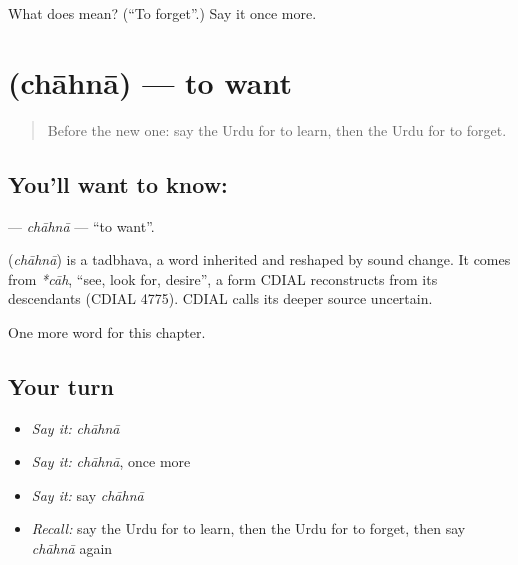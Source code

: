 \begin{tcolorbox}[breakable,colback=teal!4,colframe=teal!35!black,title={Before you move on}]
What does  mean? (\textquotedblleft{}To forget\textquotedblright{}.) Say it once more.
\end{tcolorbox}
\section[\texorpdfstring{\ur{چاہنا} (chāhnā)}{چاہنا (chāhnā)}]{ (chāhnā) — to want}

\label{lesson:UR-C51-chahna}



\begin{quote}
Before the new one: say the Urdu for to learn, then the Urdu for to forget.
\end{quote}

\subsection*{You'll want to know: }
\textbf{} — \emph{chāhnā} — \textquotedblleft{}to want\textquotedblright{}.

\begin{cousinweb}
\textbf{} (\emph{chāhnā}) is a tadbhava, a word inherited and reshaped by sound change. It comes from \emph{*cāh}, \textquotedblleft{}see, look for, desire\textquotedblright{}, a form CDIAL reconstructs from its descendants (CDIAL 4775). CDIAL calls its deeper source uncertain.
\end{cousinweb}

\begin{grammarlens}[title={What you've built}]
One more word for this chapter.
\end{grammarlens}

\subsection*{Your turn}
\begin{itemize}
\raggedright
  \item \emph{Say it:} \emph{chāhnā}
  \item \emph{Say it:} \emph{chāhnā}, once more
  \item \emph{Say it:} say \emph{chāhnā}
  \item \emph{Recall:} say the Urdu for to learn, then the Urdu for to forget, then say \emph{chāhnā} again
\end{itemize}

